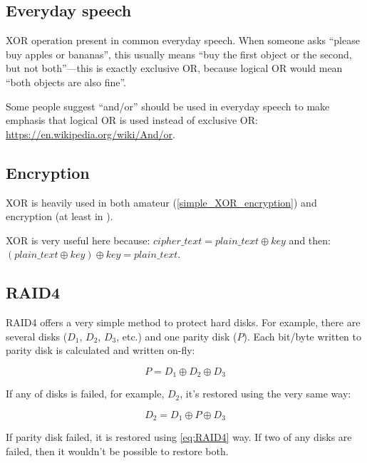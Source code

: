 ﻿
\label{XOR_property}



\subsection{Everyday speech}

XOR operation present in common everyday speech.
When someone asks ``please buy apples or bananas'',
this usually means ``buy the first object or the second, but not both''---this is exactly exclusive OR,
because logical OR would mean ``both objects are also fine''.

Some people suggest ``and/or'' should be used in everyday speech to make emphasis that logical OR is used instead of
exclusive OR: \url{https://en.wikipedia.org/wiki/And/or}.

\subsection{Encryption}

XOR is heavily used in both amateur (\ref{simple_XOR_encryption}) and  encryption (at least in ).

XOR is very useful here because:
$cipher\_text = plain\_text \oplus key$ and then:
$(plain\_text \oplus key) \oplus key = plain\_text$.

\subsection{\ac{RAID}4}

\ac{RAID}4 offers a very simple method to protect hard disks.
For example, there are several disks ($D_1$, $D_2$, $D_3$, etc.) and one parity disk ($P$).
Each bit/byte written to parity disk is calculated and written on-fly:

\begin{equation} \label{eq:RAID4}
P = D_1 \oplus D_2 \oplus D_3
\end{equation}

If any of disks is failed, for example, $D_2$, it's restored using the very same way:

\begin{equation}
D_2 = D_1 \oplus P \oplus D_3
\end{equation}

If parity disk failed, it is restored using \ref{eq:RAID4} way.
If two of any disks are failed, then it wouldn't be possible to restore both.

